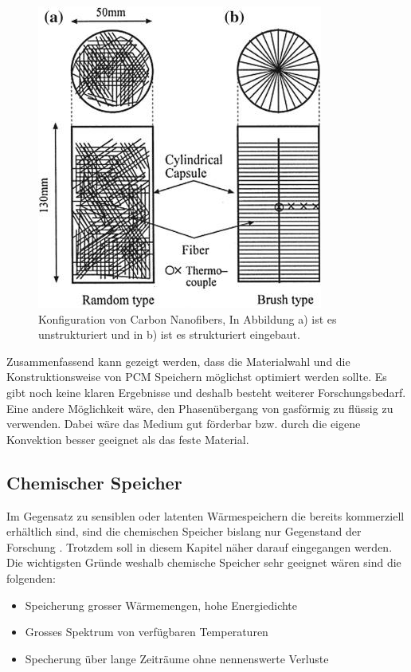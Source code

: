 \documentclass[11pt,a4paper]{scrartcl}
\begin{document}
\begin{figure}[h!]
\begin{center}
\includegraphics[scale=0.5]{images/configurationofthecarbonnanofibers.jpg}
\caption{Konfiguration von Carbon Nanofibers, In Abbildung a) ist es unstrukturiert und in b) ist es strukturiert eingebaut. \cite{WasteEnergyHarvesting}}
\label{fig:configurationofthecarbonnanofibers}
\end{center}
\end{figure}

Zusammenfassend kann gezeigt werden, dass die Materialwahl und die
Konstruktionsweise von PCM Speichern möglichst optimiert werden sollte. Es gibt
noch keine klaren Ergebnisse und deshalb besteht weiterer Forschungsbedarf.
Eine andere Möglichkeit wäre, den Phasenübergang von gasförmig zu flüssig zu
verwenden. Dabei wäre das Medium gut förderbar bzw. durch
die eigene Konvektion besser geeignet als das feste Material.


\subsection{Chemischer Speicher}
Im Gegensatz zu sensiblen oder latenten Wärmespeichern die
bereits kommerziell erhältlich sind, sind die chemischen Speicher bislang nur
Gegenstand der Forschung \cite{gegenstandderforschung}. Trotzdem soll in
diesem Kapitel näher darauf eingegangen werden. Die wichtigsten Gründe weshalb
chemische Speicher sehr geeignet wären sind die folgenden:
\begin{itemize}
\item Speicherung grosser Wärmemengen, \flqq hohe Energiedichte\frqq{} 
\item Grosses Spektrum von verfügbaren Temperaturen
\item Specherung über lange Zeiträume ohne nennenswerte Verluste
\end{itemize}
\end{document}
